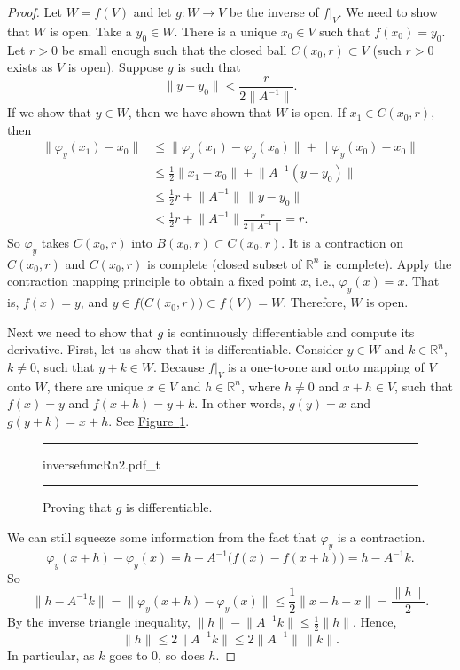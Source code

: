 \documentclass[12pt,openany]{book}
\newcommand{\snorm}[1]{\lVert {#1} \rVert}
\newcommand{\R}{{\mathbb{R}}}
\theoremstyle{plain}
\theoremstyle{remark}
\theoremstyle{definition}
\newenvironment{myfig}{%
\begin{figure}[h!t]
\noindent\rule{\textwidth}{0.5pt}\vspace{12pt}\par\centering}%
{\par\noindent\rule{\textwidth}{0.5pt}
\end{figure}}
\theoremstyle{exercise}
\theoremstyle{example}
\newcommand{\figureref}[1]{\hyperref[#1]{Figure~\ref*{#1}}}
\begin{document}
\begin{proof}
Let $W = f(V)$ and let $g \colon W \to V$ be the inverse of $f|_V$.
We need to show that $W$ is open.  Take a $y_0 \in W$.
There is a unique $x_0 \in V$ such that $f(x_0) = y_0$.
Let $r > 0$ be small enough such that the closed ball $C(x_0,r) \subset V$
(such $r > 0$ exists as $V$ is open).
Suppose $y$ is such that
\begin{equation*}
\snorm{y-y_0} <
\frac{r}{2\snorm{A^{-1}}} .
\end{equation*}
If we show that $y \in W$, then we have shown that $W$ is open.
If $x_1 \in
C(x_0,r)$, then
\begin{equation*}
\begin{split}
\snorm{\varphi_y(x_1)-x_0}
& \leq
\snorm{\varphi_y(x_1)-\varphi_y(x_0)} +
\snorm{\varphi_y(x_0)-x_0} \\
& \leq
\frac{1}{2}\snorm{x_1-x_0} +
\snorm{A^{-1}(y-y_0)} \\
& \leq
\frac{1}{2}r +
\snorm{A^{-1}} \, \snorm{y-y_0} \\
& <
\frac{1}{2}r +
\snorm{A^{-1}}
\frac{r}{2\snorm{A^{-1}}} = r .
\end{split}
\end{equation*}
So $\varphi_y$ takes $C(x_0,r)$ into $B(x_0,r) \subset C(x_0,r)$.  It is a
contraction on $C(x_0,r)$ and $C(x_0,r)$ is complete (closed subset of $\R^n$
is complete).
Apply the contraction mapping principle to obtain a fixed point $x$,
i.e., $\varphi_y(x) = x$.  That is, $f(x) = y$, and $y \in
f\bigl(C(x_0,r)\bigr) \subset f(V) = W$.  Therefore, $W$ is open.

Next we need to show that $g$ is continuously differentiable and compute
its derivative.  First, let us show that it is differentiable.
Consider $y \in W$ and $k \in \R^n$, $k\not= 0$, such that $y+k \in W$.
Because $f|_V$ is a one-to-one and onto mapping of $V$ onto $W$,
there are unique
$x \in V$ and $h \in \R^n$, where $h \not= 0$ and $x+h \in V$, such that
$f(x) = y$ and $f(x+h) = y+k$.
In other words, $g(y) = x$ and $g(y+k) = x+h$.  See
\figureref{fig:inversefuncRn2}.
\begin{myfig}
{inversefuncRn2.pdf_t}
\caption{Proving that $g$ is differentiable.\label{fig:inversefuncRn2}}
\end{myfig}

We can still
squeeze some information from the fact that $\varphi_y$ is a contraction.
\begin{equation*}
\varphi_y(x+h)-\varphi_y(x) = h + A^{-1} \bigl( f(x)-f(x+h) \bigr) = h - A^{-1} k .
\end{equation*}
So
\begin{equation*}
\snorm{h-A^{-1}k} = \snorm{\varphi_y(x+h)-\varphi_y(x)} \leq
\frac{1}{2}\snorm{x+h-x} = \frac{\snorm{h}}{2}.
\end{equation*}
By the inverse triangle inequality, $\snorm{h} - \snorm{A^{-1}k} \leq
\frac{1}{2}\snorm{h}$.
Hence,
\begin{equation*}
\snorm{h} \leq 2 \snorm{A^{-1}k} \leq 2 \snorm{A^{-1}} \, \snorm{k}.
\end{equation*}
In particular, as $k$ goes to $0$, so does $h$.


\end{proof}
\end{document}
